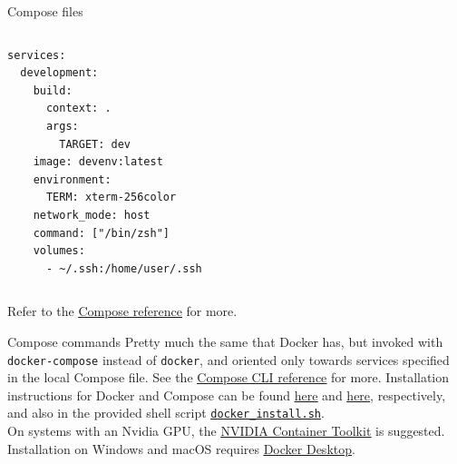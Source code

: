 \begin{frame}[fragile]{Compose files}
	\begin{columns}
		\begin{lstlisting}[language=compose, caption=Minimal example of a Compose file.]
services:
  development:
    build:
      context: .
      args:
        TARGET: dev
    image: devenv:latest
    environment:
      TERM: xterm-256color
    network_mode: host
    command: ["/bin/zsh"]
    volumes:
      - ~/.ssh:/home/user/.ssh
\end{lstlisting}
	\end{columns}
	Refer to the \href{https://docs.docker.com/compose/compose-file/}{\color{blue}\underline{Compose reference}} for more.
\end{frame}

\begin{frame}{Compose commands}
	Pretty much the same that Docker has, but invoked with
  \newline\newline
	\texttt{docker-compose}
  \newline\newline
	instead of \texttt{docker}, and oriented only towards services specified in the local Compose file.
  \newline\newline
	See the \href{https://docs.docker.com/compose/reference/}{\color{blue}\underline{Compose CLI reference}} for more.
  \newline\newline
  Installation instructions for Docker and Compose can be found \href{https://docs.docker.com/engine/install/ubuntu/}{\color{blue}\underline{here}} and \href{https://docs.docker.com/compose/install/linux/}{\color{blue}\underline{here}}, respectively, and also in the provided shell script \href{https://github.com/IntelligentSystemsLabUTV/ros2-examples/blob/humble/bin/docker_install.sh}{\color{blue}\underline{\texttt{docker\_install.sh}}}.\\
  On systems with an Nvidia GPU, the \href{https://docs.nvidia.com/datacenter/cloud-native/container-toolkit/overview.html}{\color{blue}\underline{NVIDIA Container Toolkit}} is suggested.\\
  Installation on Windows and macOS requires \href{https://www.docker.com/products/docker-desktop/}{\color{blue}\underline{Docker Desktop}}.
\end{frame}
